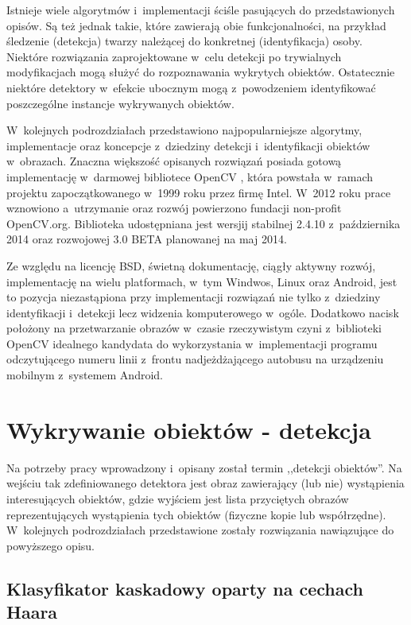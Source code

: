 Istnieje wiele algorytmów i~implementacji ściśle pasujących do
przedstawionych opisów. Są też jednak takie, które zawierają obie
funkcjonalności, na przykład śledzenie (detekcja) twarzy należącej
do konkretnej (identyfikacja) osoby. Niektóre rozwiązania zaprojektowane
w~celu detekcji po trywialnych modyfikacjach mogą służyć
do rozpoznawania wykrytych obiektów. Ostatecznie niektóre detektory
w~efekcie ubocznym mogą z~powodzeniem identyfikować poszczególne
instancje wykrywanych obiektów.

W~kolejnych podrozdziałach
przedstawiono najpopularniejsze algorytmy, implementacje
oraz koncepcje z~dziedziny detekcji i~identyfikacji obiektów w~obrazach.
Znaczna większość opisanych rozwiązań posiada gotową implementację
w~darmowej bibliotece OpenCV \cite{wiki:opencv}, która powstała
w~ramach projektu
zapoczątkowanego
w~1999 roku przez firmę Intel. W~2012 roku prace wznowiono
a~utrzymanie oraz rozwój powierzono fundacji non-profit
OpenCV.org. Biblioteka udostępniana jest wersjij
stabilnej 2.4.10 z~października 2014 oraz rozwojowej
3.0 BETA planowanej na maj 2014.

Ze względu na licencję BSD, świetną
dokumentację, ciągły aktywny rozwój, implementację na wielu platformach,
w~tym Windwos, Linux oraz Android, jest to pozycja niezastąpiona
przy implementacji rozwiązań nie tylko z~dziedziny identyfikacji
i~detekcji lecz widzenia komputerowego w~ogóle. Dodatkowo nacisk
położony na przetwarzanie obrazów w~czasie rzeczywistym czyni z~biblioteki
OpenCV idealnego kandydata do wykorzystania w~implementacji
programu odczytującego numeru linii z~frontu nadjeżdżającego
autobusu na urządzeniu mobilnym z~systemem Android.

\section{Wykrywanie obiektów - detekcja}

Na potrzeby pracy wprowadzony i~opisany został termin
,,detekcji obiektów''. Na wejściu tak zdefiniowanego detektora
jest obraz zawierający (lub nie) wystąpienia interesujących obiektów, gdzie
wyjściem jest lista przyciętych obrazów reprezentujących wystąpienia tych
obiektów (fizyczne kopie lub współrzędne). W~kolejnych podrozdziałach
przedstawione zostały rozwiązania nawiązujące do powyższego opisu.

\subsection{Klasyfikator kaskadowy oparty na cechach Haara}


